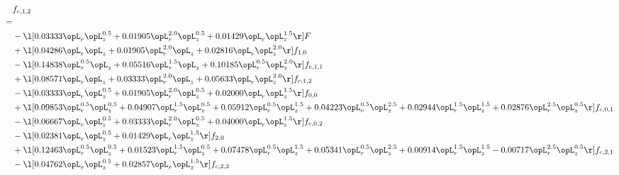 \begin{alignat}{2} 
\label{eq:f_12_1} 
& f_{c,1,2} \nonumber \\ 
 = \\ 
& - \l[  0.03333 \opL_r \opL_z^{0.5} +  0.01905 \opL_r^{2.0} \opL_z^{0.5} +  0.01429 \opL_r \opL_z^{1.5}  \r] F \nonumber \\ 
& + \l[  0.04286 \opL_r \opL_z +  0.01905 \opL_r^{2.0} \opL_z +  0.02816 \opL_r \opL_z^{2.0}  \r] f_{1,0} \nonumber \\ 
& - \l[  0.14838 \opL_r^{0.5} \opL_z +  0.05516 \opL_r^{1.5} \opL_z +  0.10185 \opL_r^{0.5} \opL_z^{2.0}  \r] f_{c,1,1} \nonumber \\ 
& + \l[  0.08571 \opL_r \opL_z +  0.03333 \opL_r^{2.0} \opL_z +  0.05633 \opL_r \opL_z^{2.0}  \r] f_{c,1,2} \nonumber \\ 
& - \l[  0.03333 \opL_r \opL_z^{0.5} +  0.01905 \opL_r^{2.0} \opL_z^{0.5} +  0.02000 \opL_r \opL_z^{1.5}  \r] f_{0,0} \nonumber \\ 
& + \l[  0.09853 \opL_r^{0.5} \opL_z^{0.5} +  0.04907 \opL_r^{1.5} \opL_z^{0.5} +  0.05912 \opL_r^{0.5} \opL_z^{1.5} +  0.04223 \opL_r^{0.5} \opL_z^{2.5} +  0.02944 \opL_r^{1.5} \opL_z^{1.5} +  0.02876 \opL_r^{2.5} \opL_z^{0.5}  \r] f_{c,0,1} \nonumber \\ 
& - \l[  0.06667 \opL_r \opL_z^{0.5} +  0.03333 \opL_r^{2.0} \opL_z^{0.5} +  0.04000 \opL_r \opL_z^{1.5}  \r] f_{c,0,2} \nonumber \\ 
& - \l[  0.02381 \opL_r \opL_z^{0.5} +  0.01429 \opL_r \opL_z^{1.5}  \r] f_{2,0} \nonumber \\ 
& + \l[  0.12463 \opL_r^{0.5} \opL_z^{0.5} +  0.01523 \opL_r^{1.5} \opL_z^{0.5} +  0.07478 \opL_r^{0.5} \opL_z^{1.5} +  0.05341 \opL_r^{0.5} \opL_z^{2.5} +  0.00914 \opL_r^{1.5} \opL_z^{1.5}   -0.00717 \opL_r^{2.5} \opL_z^{0.5}  \r] f_{c,2,1} \nonumber \\ 
& - \l[  0.04762 \opL_r \opL_z^{0.5} +  0.02857 \opL_r \opL_z^{1.5}  \r] f_{c,2,2} \nonumber \\ 
\end{alignat} 


